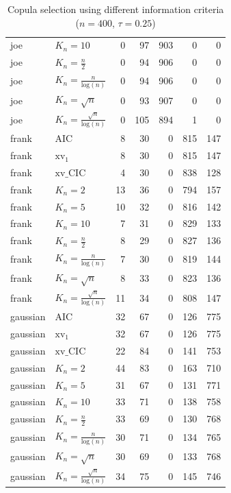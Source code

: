 \begin{table}[htbp]
\begin{tabular}{llrrrrr}
  joe & $K_{n}=10$ & 0 & 97 & 903 & 0 & 0 \\ 
  joe & $K_{n}=\tfrac{n}{2}$ & 0 & 94 & 906 & 0 & 0 \\ 
  joe & $K_{n}=\tfrac{n}{\text{log}(n)}$ & 0 & 94 & 906 & 0 & 0 \\ 
  joe & $K_{n}=\sqrt{n}$ & 0 & 93 & 907 & 0 & 0 \\ 
  joe & $K_{n}=\tfrac{\sqrt{n}}{\text{log}(n)}$ & 0 & 105 & 894 & 1 & 0 \\ 
   \hdashline
frank & AIC & 8 & 30 & 0 & 815 & 147 \\ 
  frank & $\text{xv}_{1}$ & 8 & 30 & 0 & 815 & 147 \\ 
  frank & $\text{xv}\_\text{CIC}$ & 4 & 30 & 0 & 838 & 128 \\ 
  frank & $K_{n}=2$ & 13 & 36 & 0 & 794 & 157 \\ 
  frank & $K_{n}=5$ & 10 & 32 & 0 & 816 & 142 \\ 
  frank & $K_{n}=10$ & 7 & 31 & 0 & 829 & 133 \\ 
  frank & $K_{n}=\tfrac{n}{2}$ & 8 & 29 & 0 & 827 & 136 \\ 
  frank & $K_{n}=\tfrac{n}{\text{log}(n)}$ & 7 & 30 & 0 & 819 & 144 \\ 
  frank & $K_{n}=\sqrt{n}$ & 8 & 33 & 0 & 823 & 136 \\ 
  frank & $K_{n}=\tfrac{\sqrt{n}}{\text{log}(n)}$ & 11 & 34 & 0 & 808 & 147 \\ 
   \hdashline
gaussian & AIC & 32 & 67 & 0 & 126 & 775 \\ 
  gaussian & $\text{xv}_{1}$ & 32 & 67 & 0 & 126 & 775 \\ 
  gaussian & $\text{xv}\_\text{CIC}$ & 22 & 84 & 0 & 141 & 753 \\ 
  gaussian & $K_{n}=2$ & 44 & 83 & 0 & 163 & 710 \\ 
  gaussian & $K_{n}=5$ & 31 & 67 & 0 & 131 & 771 \\ 
  gaussian & $K_{n}=10$ & 33 & 71 & 0 & 138 & 758 \\ 
  gaussian & $K_{n}=\tfrac{n}{2}$ & 33 & 69 & 0 & 130 & 768 \\ 
  gaussian & $K_{n}=\tfrac{n}{\text{log}(n)}$ & 30 & 71 & 0 & 134 & 765 \\ 
  gaussian & $K_{n}=\sqrt{n}$ & 30 & 69 & 0 & 133 & 768 \\ 
  gaussian & $K_{n}=\tfrac{\sqrt{n}}{\text{log}(n)}$ & 34 & 75 & 0 & 145 & 746 \\ 
   \hline
\end{tabular}
\caption{Copula selection using different information criteria ($n = 400$, $\tau = 0.25$)} 
\end{table}


